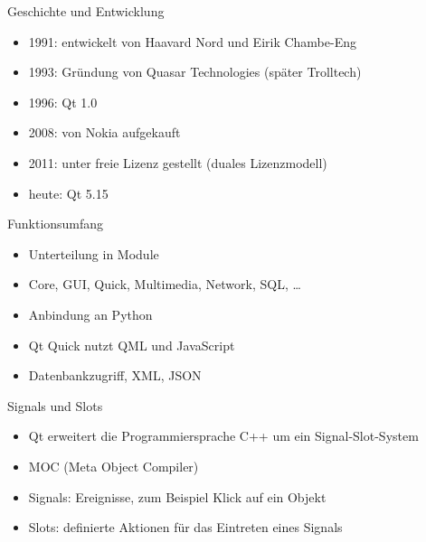 \documentclass[aspectratio=169]{beamer}
\begin{document}

\begin{frame}{Geschichte und Entwicklung}
\begin{itemize}
\item 1991: entwickelt von Haavard Nord und Eirik Chambe-Eng
\item 1993: Gründung von Quasar Technologies (später Trolltech)
\item 1996: Qt 1.0
\item 2008: von Nokia aufgekauft
\item 2011: unter freie Lizenz gestellt (duales Lizenzmodell)
\item heute: Qt 5.15
\end{itemize}
\end{frame}


\begin{frame}{Funktionsumfang}
\begin{itemize}
\item Unterteilung in Module
\item[\ding{237}] Core, GUI, Quick, Multimedia, Network, SQL, \ldots
\item Anbindung an Python
\item Qt Quick nutzt QML und JavaScript
\item Datenbankzugriff, XML, JSON
\end{itemize}
\end{frame}


\begin{frame}{Signals und Slots}
\begin{itemize}
\item Qt erweitert die Programmiersprache C++ um ein Signal-Slot-System
\item[\ding{237}] MOC (Meta Object Compiler)
\item[\ding{237}] Signals: Ereignisse, zum Beispiel Klick auf ein Objekt
\item[\ding{237}] Slots: definierte Aktionen für das Eintreten eines Signals
\end{itemize}
\end{frame}

\end{document}
